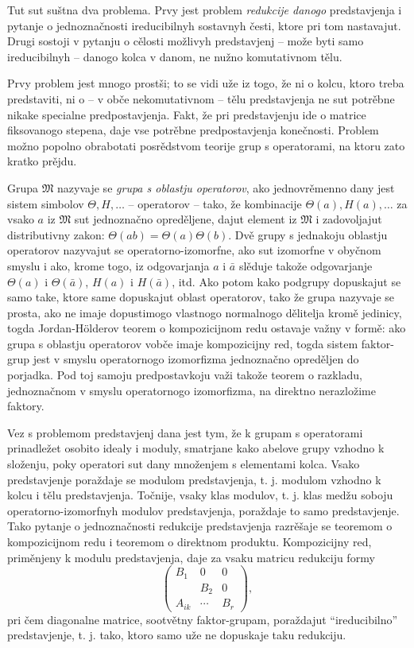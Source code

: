 \documentclass[11pt]{article}
\begin{document}
Tut sut suštna dva problema. Prvy jest problem \emph{redukcije danogo} predstavjenja i pytanje o jednoznačnosti ireducibilnyh sostavnyh česti, ktore pri tom nastavajut. Drugi sostoji v pytanju o cělosti možlivyh predstavjenj -- može byti samo ireducibilnyh -- danogo kolca v danom, ne nužno komutativnom tělu.

Prvy problem jest mnogo prostši; to se vidi uže iz togo, že ni o kolcu, ktoro treba predstaviti, ni o -- v obče nekomutativnom -- tělu predstavjenja ne sut potrěbne nikake specialne predpostavjenja. Fakt, že pri predstavjenju ide o matrice fiksovanogo stepena, daje vse potrěbne predpostavjenja konečnosti. Problem možno popolno obrabotati posrědstvom teorije grup s operatorami, na ktoru zato kratko prějdu.

Grupa $\mathfrak{M}$ nazyvaje se \emph{grupa s oblastju operatorov}, ako jednovrěmenno dany jest sistem simbolov $\Theta,H,\ldots$ -- operatorov -- tako, že kombinacije $\Theta(a),H(a),\ldots$ za vsako $a$ iz $\mathfrak{M}$ sut jednoznačno opreděljene, dajut element iz $\mathfrak{M}$ i zadovoljajut distributivny zakon: $\Theta(ab)=\Theta(a)\Theta(b)$. Dvě grupy s jednakoju oblastju operatorov nazyvajut se operatorno-izomorfne, ako sut izomorfne v obyčnom smyslu i ako, krome togo, iz odgovarjanja $a$ i $\bar a$ slěduje takože odgovarjanje $\Theta(a)$ i $\Theta(\bar a)$, $H(a)$ i $H(\bar a)$, itd. Ako potom kako podgrupy dopuskajut se samo take, ktore same dopuskajut oblast operatorov, tako že grupa nazyvaje se prosta, ako ne imaje dopustimogo vlastnogo normalnogo dělitelja kromě jedinicy, togda Jordan-Hölderov teorem o kompozicijnom redu ostavaje važny v formě: ako grupa s oblastju operatorov vobče imaje kompozicijny red, togda sistem faktor-grup jest v smyslu operatornogo izomorfizma jednoznačno opreděljen do porjadka. Pod toj samoju predpostavkoju važi takože teorem o razkladu, jednoznačnom v smyslu operatornogo izomorfizma, na direktno nerazložime faktory.

Vez s problemom predstavjenj dana jest tym, že k grupam s operatorami prinadležet osobito idealy i moduly, smatrjane kako abelove grupy vzhodno k složenju, poky operatori sut dany množenjem s elementami kolca. Vsako predstavjenje poraždaje se modulom predstavjenja, t. j. modulom vzhodno k kolcu i tělu predstavjenja. Točnije, vsaky klas modulov, t. j. klas medžu soboju operatorno-izomorfnyh modulov predstavjenja, poraždaje to samo predstavjenje. Tako pytanje o jednoznačnosti redukcije predstavjenja razrěšaje se teoremom o kompozicijnom redu i teoremom o direktnom produktu. Kompozicijny red, priměnjeny k modulu predstavjenja, daje za vsaku matricu redukciju formy
\[
\begin{pmatrix}
B_1&0&0\\
&B_2&0\\
A_{ik}&\cdots&B_r
\end{pmatrix},
\]
pri čem diagonalne matrice, sootvětny faktor-grupam, poraždajut “ireducibilno” predstavjenje, t. j. tako, ktoro samo uže ne dopuskaje taku redukciju.
\end{document}

